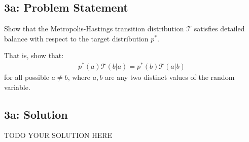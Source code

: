 \documentclass[10pt]{article}
\newcommand{\officialdirections}[1]{{\color{purple} #1}}
\begin{document}
\officialdirections{
\subsection*{3a: Problem Statement}
Show that the Metropolis-Hastings transition distribution $\mathcal{T}$ satisfies detailed balance with respect to the target distribution $p^*$. 

That is, show that:
\begin{align}
p^*( a) \mathcal{T}( b | a)  = p^*(b) \mathcal{T}( a | b)
\end{align}
for all possible $a \neq b$, where $a, b$ are any two distinct values of the random variable.
}

\subsection{3a: Solution}
TODO YOUR SOLUTION HERE
\end{document}
